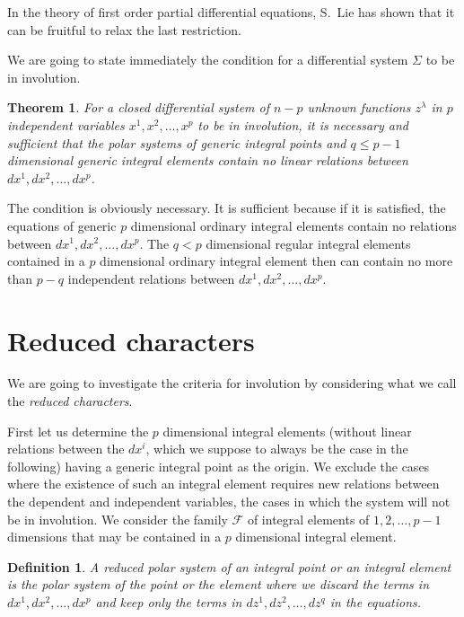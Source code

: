 \documentclass[leqno,11pt]{book}
\numberwithin{equation}{chapter}
\theoremstyle{shape1}
\newtheorem*{thm*}{\hspace{15pt}Theorem}
\newtheorem*{dfn*}{\hspace{15pt}Definition}
\theoremstyle{shape0}
\theoremstyle{shape2}
\theoremstyle{definition}
\begin{document}
In the theory of first order partial differential equations, S.~Lie has shown that it can be fruitful to relax the last restriction.



\vspace{12pt}\fsec We are going to state immediately the condition for a differential system $\Sigma$ to be in involution.
\begin{thm*}
  For a closed differential system of $n-p$ unknown functions $z^{\lambda}$ in $p$ independent variables $x^{1},x^{2},\dots,x^{p}$ to be in involution, it is necessary and sufficient that the polar systems of  generic integral points and $q\le p-1$ dimensional generic integral elements contain no linear relations between $dx^{1},dx^{2},\dots,dx^{p}$.
\end{thm*}

The condition is obviously necessary. It is sufficient because if it is satisfied, the equations of generic $p$ dimensional ordinary integral elements contain no relations between $dx^{1},dx^{2},\dots,dx^{p}$. The $q<p$ dimensional regular integral elements contained in a $p$ dimensional ordinary integral element then can contain no more than $p-q$ independent relations between $dx^{1},dx^{2},\dots,dx^{p}$.


\section{Reduced characters}
\label{sec:reduced-characters}

\fsec We are going to investigate the criteria for involution by considering what we call the \emph{reduced characters}.

First let us determine the $p$ dimensional integral elements (without linear relations between the $dx^{i}$, which we suppose to always be the case in the following) having a generic integral point as the origin. We exclude the cases where the existence of such an integral element requires new relations between the dependent and independent variables, the cases in which the system will not be in involution. We consider the family $\mathcal{F}$ of integral elements of $1,2,\dots,p-1$ dimensions that may be contained in a $p$ dimensional integral element.
\begin{dfn*}
  A reduced polar system of an integral point or an integral element is the polar system of the point or the element where  we discard the terms in $dx^{1},dx^{2},\dots,dx^{p}$ and keep only the terms in $dz^{1},dz^{2},\dots,dz^{q}$ in the equations.
\end{dfn*}
\end{document}
